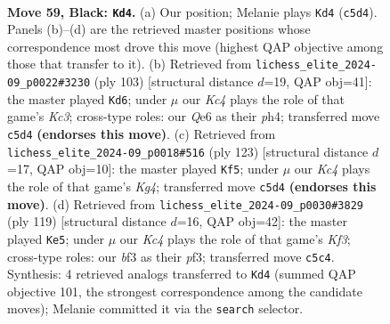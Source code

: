 \documentclass[11pt]{article}
\begin{document}
\clearpage

\begin{figure}[p]\centering
\begin{subfigure}{0.46\textwidth}\centering
\resizebox{\linewidth}{!}{%
\newchessgame
\chessboard[
  setfen={8/8/4q3/2k5/Rp6/b4BK1/8/8 b - - 9 59},
  showmover=false,
  pgfstyle=straightmove, color=movearrow, markmove={c5-d4}
]}
\caption{}
\end{subfigure}\hfill
\begin{subfigure}{0.46\textwidth}\centering
\resizebox{\linewidth}{!}{%
\newchessgame
\chessboard[
  setfen={8/8/2k5/6Rp/1K4bP/8/8/8 b - - 2 52},
  showmover=false,
  pgfstyle=straightmove, color=movearrow, markmove={c6-d6}
]}
\caption{}
\end{subfigure}
\\[4pt]
\begin{subfigure}{0.46\textwidth}\centering
\resizebox{\linewidth}{!}{%
\newchessgame
\chessboard[
  setfen={8/8/1R6/1p4k1/2bK4/8/8/8 b - - 1 62},
  showmover=false,
  pgfstyle=straightmove, color=movearrow, markmove={g5-f5}
]}
\caption{}
\end{subfigure}\hfill
\begin{subfigure}{0.46\textwidth}\centering
\resizebox{\linewidth}{!}{%
\newchessgame
\chessboard[
  setfen={8/8/5k2/8/6Rp/5Pb1/4K3/8 b - - 13 60},
  showmover=false,
  pgfstyle=straightmove, color=movearrow, markmove={f6-e5}
]}
\caption{}
\end{subfigure}
\caption{\textbf{Move 59, Black: \texttt{Kd4}.} (a) Our position; Melanie plays \texttt{Kd4} (\texttt{c5d4}). Panels (b)--(d) are the retrieved master positions whose correspondence most drove this move (highest QAP objective among those that transfer to it). (b) Retrieved from \texttt{lichess\_elite\_2024-09\_p0022\#3230} (ply 103) [structural distance $d$=19, QAP obj=41]: the master played \texttt{Kd6}; under $\mu$ our \emph{Kc4} plays the role of that game's \emph{Kc3}; cross-type roles: our \emph{Q}e6 as their \emph{p}h4; transferred move \texttt{c5d4} \textbf{(endorses this move)}. (c) Retrieved from \texttt{lichess\_elite\_2024-09\_p0018\#516} (ply 123) [structural distance $d$=17, QAP obj=10]: the master played \texttt{Kf5}; under $\mu$ our \emph{Kc4} plays the role of that game's \emph{Kg4}; transferred move \texttt{c5d4} \textbf{(endorses this move)}. (d) Retrieved from \texttt{lichess\_elite\_2024-09\_p0030\#3829} (ply 119) [structural distance $d$=16, QAP obj=42]: the master played \texttt{Ke5}; under $\mu$ our \emph{Kc4} plays the role of that game's \emph{Kf3}; cross-type roles: our \emph{b}f3 as their \emph{p}f3; transferred move \texttt{c5c4}. Synthesis: 4 retrieved analogs transferred to \texttt{Kd4} (summed QAP objective 101, the strongest correspondence among the candidate moves); Melanie committed it via the \texttt{search} selector.}
\label{fig:thought-m117}
\end{figure}
\end{document}
